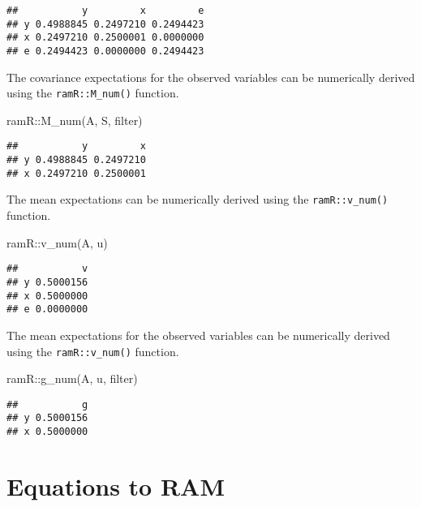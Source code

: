 \documentclass[
]{book}
\newenvironment{Shaded}{\begin{snugshade}}{\end{snugshade}}
\newcommand{\FunctionTok}[1]{\textcolor[rgb]{0.00,0.00,0.00}{#1}}
\newcommand{\NormalTok}[1]{#1}
\newcommand{\SpecialCharTok}[1]{\textcolor[rgb]{0.00,0.00,0.00}{#1}}
\theoremstyle{definition}
\theoremstyle{definition}
\theoremstyle{definition}
\theoremstyle{remark}
\begin{document}
\begin{verbatim}
##           y         x         e
## y 0.4988845 0.2497210 0.2494423
## x 0.2497210 0.2500001 0.0000000
## e 0.2494423 0.0000000 0.2494423
\end{verbatim}

The covariance expectations for the observed variables
can be numerically derived using the \texttt{ramR::M\_num()} function.

\begin{Shaded}
\begin{Highlighting}[]
\NormalTok{ramR}\SpecialCharTok{::}\FunctionTok{M\_num}\NormalTok{(A, S, filter)}
\end{Highlighting}
\end{Shaded}

\begin{verbatim}
##           y         x
## y 0.4988845 0.2497210
## x 0.2497210 0.2500001
\end{verbatim}

The mean expectations
can be numerically derived using the \texttt{ramR::v\_num()} function.

\begin{Shaded}
\begin{Highlighting}[]
\NormalTok{ramR}\SpecialCharTok{::}\FunctionTok{v\_num}\NormalTok{(A, u)}
\end{Highlighting}
\end{Shaded}

\begin{verbatim}
##           v
## y 0.5000156
## x 0.5000000
## e 0.0000000
\end{verbatim}

The mean expectations for the observed variables
can be numerically derived using the \texttt{ramR::v\_num()} function.

\begin{Shaded}
\begin{Highlighting}[]
\NormalTok{ramR}\SpecialCharTok{::}\FunctionTok{g\_num}\NormalTok{(A, u, filter)}
\end{Highlighting}
\end{Shaded}

\begin{verbatim}
##           g
## y 0.5000156
## x 0.5000000
\end{verbatim}

\hypertarget{equations-to-ram}{%
\section{Equations to RAM}\label{equations-to-ram}}
\end{document}
